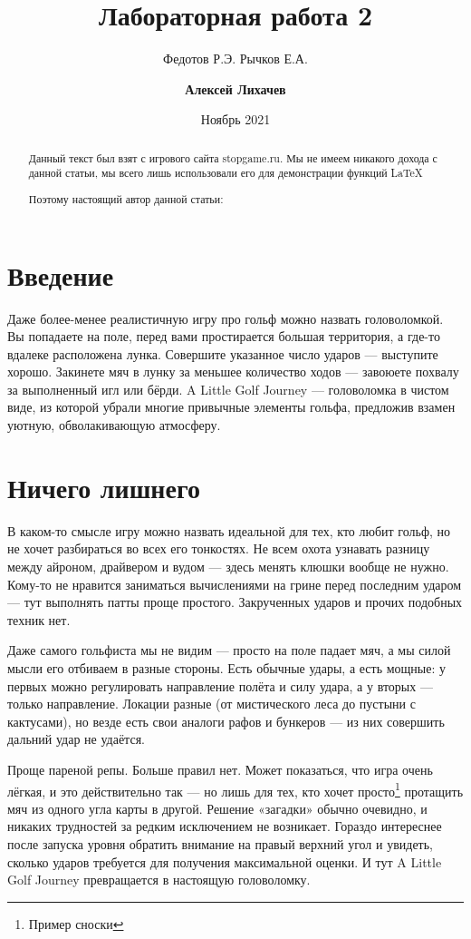 \documentclass{article}
\title{Лабораторная работа 2}
\author{Федотов Р.Э. Рычков Е.А.}
\date{Ноябрь 2021}
\begin{document}
\maketitle
\begin{abstract}
    Данный текст был взят с игрового сайта stopgame.ru. Мы не имеем никакого дохода с данной статьи, мы всего лишь использовали его для демонстрации функций \LaTeX 
    
    Поэтому настоящий автор данной статьи:
    \author{\textbf{Алексей Лихачев}}
\end{abstract}
\section*{Введение}

Даже более-менее реалистичную игру про гольф можно назвать головоломкой. Вы попадаете на поле, перед вами простирается большая территория, а где-то вдалеке расположена лунка. Совершите указанное число ударов — выступите хорошо. Закинете мяч в лунку за меньшее количество ходов — завоюете похвалу за выполненный игл или бёрди. A Little Golf Journey — головоломка в чистом виде, из которой убрали многие привычные элементы гольфа, предложив взамен уютную, обволакивающую атмосферу.

\section{Ничего лишнего}

В каком-то смысле игру можно назвать идеальной для тех, кто любит гольф, но не хочет разбираться во всех его тонкостях. Не всем охота узнавать разницу между айроном, драйвером и вудом — здесь менять клюшки вообще не нужно. Кому-то не нравится заниматься вычислениями на грине перед последним ударом — тут выполнять патты проще простого. Закрученных ударов и прочих подобных техник нет.

Даже самого гольфиста мы не видим — просто на поле падает мяч, а мы силой мысли его отбиваем в разные стороны. Есть обычные удары, а есть мощные: у первых можно регулировать направление полёта и силу удара, а у вторых — только направление. Локации разные (от мистического леса до пустыни с кактусами), но везде есть свои аналоги рафов и бункеров — из них совершить дальний удар не удаётся.


Проще пареной репы.
Больше правил нет. Может показаться, что игра очень лёгкая, и это действительно так —  но лишь для тех, кто хочет просто\footnote{Пример сноски} протащить мяч из одного угла карты в другой. Решение «загадки» обычно очевидно, и никаких трудностей за редким исключением не возникает. Гораздо интереснее после запуска уровня обратить внимание на правый верхний угол и увидеть, сколько ударов требуется для получения максимальной оценки. И тут A Little Golf Journey превращается в настоящую головоломку.
\end{document}
